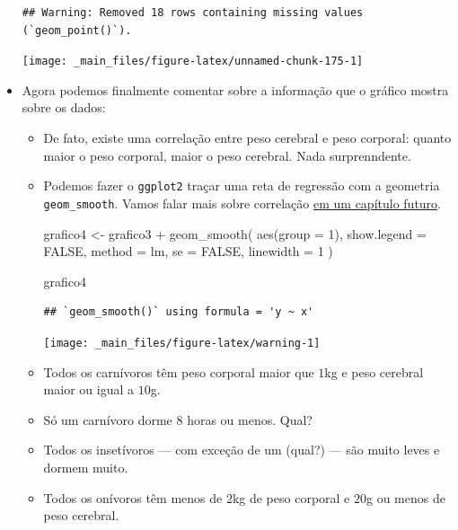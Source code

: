 \documentclass[
  11pt]{report}
\newenvironment{Shaded}{\begin{snugshade}}{\end{snugshade}}
\newcommand{\AttributeTok}[1]{\textcolor[rgb]{0.77,0.63,0.00}{#1}}
\newcommand{\ConstantTok}[1]{\textcolor[rgb]{0.00,0.00,0.00}{#1}}
\newcommand{\DecValTok}[1]{\textcolor[rgb]{0.00,0.00,0.81}{#1}}
\newcommand{\FunctionTok}[1]{\textcolor[rgb]{0.00,0.00,0.00}{#1}}
\newcommand{\NormalTok}[1]{#1}
\newcommand{\OtherTok}[1]{\textcolor[rgb]{0.56,0.35,0.01}{#1}}
\newcommand{\SpecialCharTok}[1]{\textcolor[rgb]{0.00,0.00,0.00}{#1}}
\newcommand{\StringTok}[1]{\textcolor[rgb]{0.31,0.60,0.02}{#1}}
\renewenvironment{Shaded}{
    \begin{mdframed}[%
      roundcorner=2pt,%
      innerleftmargin=5pt,%
      innerrightmargin=5pt,%
      topline=true,%
      leftline=true,%
      rightline=true,%
      bottomline=true,%
      linewidth=0.5pt,%
      linecolor=black!20,%
      backgroundcolor=black!2,%
      skipabove=2ex,%
      skipbelow=2.5ex%
    ]%
  }
  {
    \end{mdframed}
  }
\begin{document}
\begin{itemize}
\begin{verbatim}
## Warning: Removed 18 rows containing missing values (`geom_point()`).
\end{verbatim}

  \begin{center}\texttt{[image: \_main\_files/figure-latex/unnamed-chunk-175-1]} \end{center}
\item
  Agora podemos finalmente comentar sobre a informação que o gráfico mostra sobre os dados:

  \begin{itemize}
  \item
    De fato, existe uma correlação entre peso cerebral e peso corporal: quanto maior o peso corporal, maior o peso cerebral. Nada surprenndente.
  \item
    \protect\hypertarget{grafico4}{}{} Podemos fazer o \texttt{ggplot2} traçar uma reta de regressão com a geometria \texttt{geom\_smooth}. Vamos falar mais sobre correlação \protect\hyperlink{correlacao}{em um capítulo futuro}.

\begin{Shaded}
\begin{Highlighting}[]
\NormalTok{grafico4 }\OtherTok{\textless{}{-}}\NormalTok{ grafico3 }\SpecialCharTok{+}
  \FunctionTok{geom\_smooth}\NormalTok{(}
    \FunctionTok{aes}\NormalTok{(}\AttributeTok{group =} \DecValTok{1}\NormalTok{), }
    \AttributeTok{show.legend =} \ConstantTok{FALSE}\NormalTok{,}
    \AttributeTok{method =} \StringTok{\textquotesingle{}lm\textquotesingle{}}\NormalTok{, }
    \AttributeTok{se =} \ConstantTok{FALSE}\NormalTok{,}
    \AttributeTok{linewidth =} \DecValTok{1}
\NormalTok{  )}

\NormalTok{grafico4}
\end{Highlighting}
\end{Shaded}

\begin{verbatim}
## `geom_smooth()` using formula = 'y ~ x'
\end{verbatim}

    \begin{center}\texttt{[image: \_main\_files/figure-latex/warning-1]} \end{center}
  \item
    Todos os carnívoros têm peso corporal maior que $1$kg e peso cerebral maior ou igual a $10$g.
  \item
    Só um carnívoro dorme $8$ horas ou menos. Qual?
  \item
    Todos os insetívoros --- com exceção de um (qual?) --- são muito leves e dormem muito.
  \item
    Todos os onívoros têm menos de $2$kg de peso corporal e $20$g ou menos de peso cerebral.
  \end{itemize}
\end{itemize}
\end{document}
